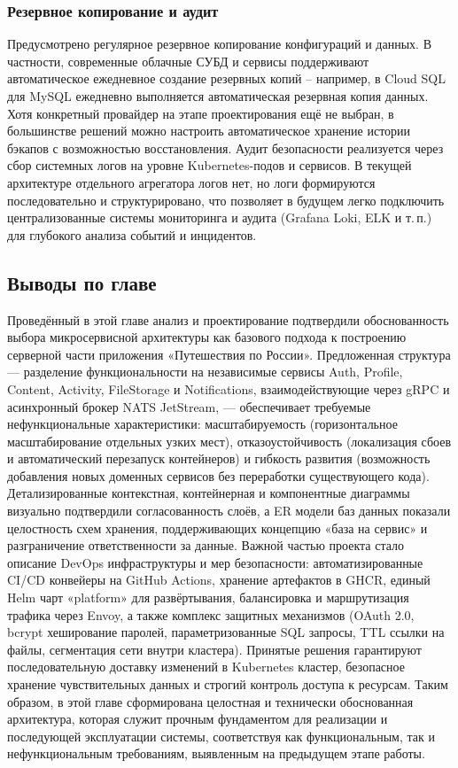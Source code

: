 \subsubsection*{Резервное копирование и аудит}
Предусмотрено регулярное резервное копирование конфигураций и данных. В частности, современные облачные СУБД и сервисы поддерживают автоматическое ежедневное создание резервных копий – например, в Cloud SQL для MySQL ежедневно выполняется автоматическая резервная копия данных. Хотя конкретный провайдер на этапе проектирования ещё не выбран, в большинстве решений можно настроить автоматическое хранение истории бэкапов с возможностью восстановления. Аудит безопасности реализуется через сбор системных логов на уровне Kubernetes-подов и сервисов. В текущей архитектуре отдельного агрегатора логов нет, но логи формируются последовательно и структурировано, что позволяет в будущем легко подключить централизованные системы мониторинга и аудита (Grafana Loki, ELK и т. п.) для глубокого анализа событий и инцидентов.

\subsection*{Выводы по главе}
Проведённый в этой главе анализ и проектирование подтвердили обоснованность выбора микросервисной архитектуры как базового подхода к построению серверной части приложения «Путешествия по России». Предложенная структура — разделение функциональности на независимые сервисы Auth, Profile, Content, Activity, FileStorage и Notifications, взаимодействующие через gRPC и асинхронный брокер NATS JetStream, — обеспечивает требуемые нефункциональные характеристики: масштабируемость (горизонтальное масштабирование отдельных узких мест), отказоустойчивость (локализация сбоев и автоматический перезапуск контейнеров) и гибкость развития (возможность добавления новых доменных сервисов без переработки существующего кода). Детализированные контекстная, контейнерная и компонентные диаграммы визуально подтвердили согласованность слоёв, а ER модели баз данных показали целостность схем хранения, поддерживающих концепцию «база на сервис» и разграничение ответственности за данные.
Важной частью проекта стало описание DevOps инфраструктуры и мер безопасности: автоматизированные CI/CD конвейеры на GitHub Actions, хранение артефактов в GHCR, единый Helm чарт «platform» для развёртывания, балансировка и маршрутизация трафика через Envoy, а также комплекс защитных механизмов (OAuth 2.0, bcrypt хеширование паролей, параметризованные SQL запросы, TTL ссылки на файлы, сегментация сети внутри кластера). Принятые решения гарантируют последовательную доставку изменений в Kubernetes кластер, безопасное хранение чувствительных данных и строгий контроль доступа к ресурсам. Таким образом, в этой главе сформирована целостная и технически обоснованная архитектура, которая служит прочным фундаментом для реализации и последующей эксплуатации системы, соответствуя как функциональным, так и нефункциональным требованиям, выявленным на предыдущем этапе работы.

